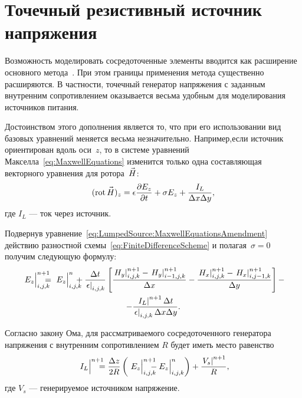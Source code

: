 %
%
%

\section{Точечный резистивный источник напряжения}
\label{div:LumpedSource}

Возможность моделировать сосредоточенные элементы вводится как расширение
основного метода~\cite{bib:Taflove1995,bib:Davidson2005,bib:PiketMay1994,
bib:Maloney1994}. При этом границы применения метода существенно расширяются.
В частности, точечный генератор напряжения с заданным внутренним сопротивлением
оказывается весьма удобным для моделирования источников питания.

Достоинством этого дополнения является то, что при его использовании вид базовых
уравнений меняется весьма незначительно. Например,если источник ориентирован
вдоль оси~$z$, то в системе уравнений Макселла~\eqref{eq:MaxwellEquations}
изменится только одна составляющая векторного уравнения для ротора~$\vec{H\mathstrut}$:
\begin{equation}
    \label{eq:LumpedSource:MaxwellEquationsAmendment}
    (\operatorname{rot}\vec{H\mathstrut})_z = \epsilon\frac{\partial{E_z}}{\partial{t}} +
        \sigma E_z + \frac{I_L}{\Delta{x}\Delta{y}},
\end{equation}
где $I_L$ --- ток через источник.

Подвернув уравнение~\eqref{eq:LumpedSource:MaxwellEquationsAmendment} действию
разностной схемы~\eqref{eq:FiniteDifferenceScheme} и полагая~$\sigma=0$ получим
следующую формулу:
\begin{multline}
    \label{eq:LumpedSource:FdtdEquationsAmendmentWithI}
    \fYee{E_z}{n+1}{i,j,k} = \fYee{E_z}{n}{i,j,k} +
        \frac{\Delta{t}}{\yee{\epsilon}{}{i,j,k}}
        \left[
            \frac{\yee{H_y}{n+1}{i,j,k}-\yee{H_y}{n+1}{i-1,j,k}}{\Delta{x}} -
            \frac{\yee{H_x}{n+1}{i,j,k}-\yee{H_x}{n+1}{i,j-1,k}}{\Delta{y}}
        \right] - \\ -
        \frac{\yee{I_L}{n+1}{}\Delta{t}}
             {\yee{\epsilon}{}{i,j,k}\Delta{x}\Delta{y}}.
\end{multline}

Согласно закону Ома, для рассматриваемого сосредоточенного генератора напряжения
с внутренним сопротивлением $R$ будет иметь место равенство
\begin{equation}
    \label{eq:LumpedSource:OhmLaw}
    \fYee{I_L}{n+1}{} = \frac{\Delta{z}}{2R}
    \left(
        \fYee{E_z}{n+1}{i,j,k} - \Yee{E_z}{n}{i,j,k}
    \right) +
    \frac{\yee{V_s}{n+1}{}}{R},
\end{equation}
где $V_s$ --- генерируемое источником напряжение.

